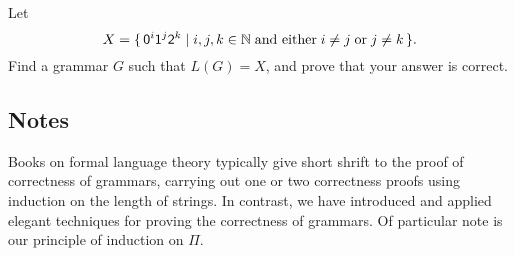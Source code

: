 \begin{exercise}
Let
\begin{displaymath}
X = \{ \, \mathsf{0}^i\mathsf{1}^j\mathsf{2}^k \mid i,j,k\in\mathbb{N}\;\allowbreak\mbox{and either}\allowbreak\;
i\neq j\;\allowbreak\mbox{or}\allowbreak\;j\neq k \, \} .
\end{displaymath}
Find a grammar $G$ such that $L(G) = X$, and prove that your answer is
correct.
\end{exercise}

\subsection{Notes}

Books on formal language theory typically give short shrift to the
proof of correctness of grammars, carrying out one or two
correctness proofs using induction on the length of strings.  In
contrast, we have introduced and applied elegant techniques for
proving the correctness of grammars.  Of particular note is our principle
of induction on $\Pi$.

